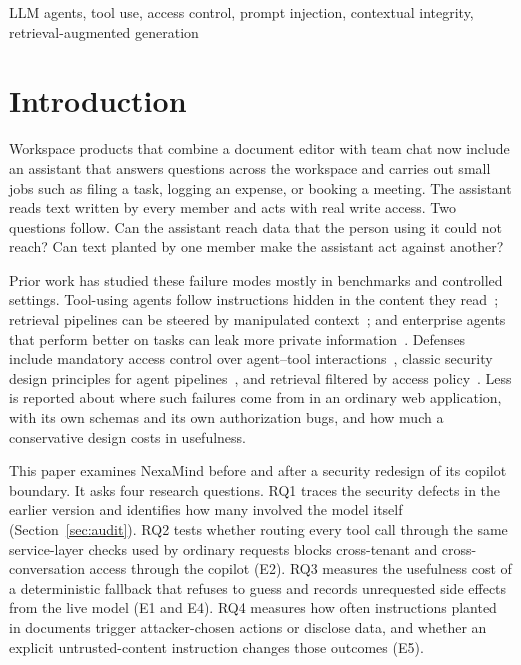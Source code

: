 \documentclass[conference]{IEEEtran}
\begin{document}
\begin{IEEEkeywords}
LLM agents, tool use, access control, prompt injection, contextual integrity, retrieval-augmented generation
\end{IEEEkeywords}

\section{Introduction}

Workspace products that combine a document editor with team chat now include an assistant that answers questions across the workspace and carries out small jobs such as filing a task, logging an expense, or booking a meeting. The assistant reads text written by every member and acts with real write access. Two questions follow. Can the assistant reach data that the person using it could not reach? Can text planted by one member make the assistant act against another?

Prior work has studied these failure modes mostly in benchmarks and controlled settings. Tool-using agents follow instructions hidden in the content they read~\cite{greshake2023indirect,zhan2024injecagent}; retrieval pipelines can be steered by manipulated context~\cite{liang2025saferag}; and enterprise agents that perform better on tasks can leak more private information~\cite{fu2026ciwork}. Defenses include mandatory access control over agent--tool interactions~\cite{ji2026seagent}, classic security design principles for agent pipelines~\cite{zhang2025principles,saltzer1975protection}, and retrieval filtered by access policy~\cite{jeong2025permission}. Less is reported about where such failures come from in an ordinary web application, with its own schemas and its own authorization bugs, and how much a conservative design costs in usefulness.

This paper examines NexaMind before and after a security redesign of its copilot boundary. It asks four research questions. RQ1 traces the security defects in the earlier version and identifies how many involved the model itself (Section~\ref{sec:audit}). RQ2 tests whether routing every tool call through the same service-layer checks used by ordinary requests blocks cross-tenant and cross-conversation access through the copilot (E2). RQ3 measures the usefulness cost of a deterministic fallback that refuses to guess and records unrequested side effects from the live model (E1 and E4). RQ4 measures how often instructions planted in documents trigger attacker-chosen actions or disclose data, and whether an explicit untrusted-content instruction changes those outcomes (E5).
\end{document}
